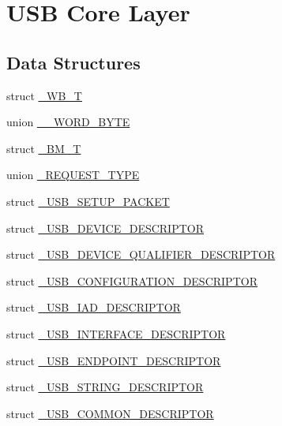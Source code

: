 \hypertarget{group__USBD__Core}{\section{U\-S\-B Core Layer}
\label{group__USBD__Core}
}
\subsection*{Data Structures}
\begin{DoxyCompactItemize}
\item 
struct \hyperlink{struct__WB__T}{\-\_\-\-W\-B\-\_\-\-T}
\item 
union \hyperlink{union____WORD__BYTE}{\-\_\-\-\_\-\-W\-O\-R\-D\-\_\-\-B\-Y\-T\-E}
\item 
struct \hyperlink{struct__BM__T}{\-\_\-\-B\-M\-\_\-\-T}
\item 
union \hyperlink{union__REQUEST__TYPE}{\-\_\-\-R\-E\-Q\-U\-E\-S\-T\-\_\-\-T\-Y\-P\-E}
\item 
struct \hyperlink{struct__USB__SETUP__PACKET}{\-\_\-\-U\-S\-B\-\_\-\-S\-E\-T\-U\-P\-\_\-\-P\-A\-C\-K\-E\-T}
\item 
struct \hyperlink{struct__USB__DEVICE__DESCRIPTOR}{\-\_\-\-U\-S\-B\-\_\-\-D\-E\-V\-I\-C\-E\-\_\-\-D\-E\-S\-C\-R\-I\-P\-T\-O\-R}
\item 
struct \hyperlink{struct__USB__DEVICE__QUALIFIER__DESCRIPTOR}{\-\_\-\-U\-S\-B\-\_\-\-D\-E\-V\-I\-C\-E\-\_\-\-Q\-U\-A\-L\-I\-F\-I\-E\-R\-\_\-\-D\-E\-S\-C\-R\-I\-P\-T\-O\-R}
\item 
struct \hyperlink{struct__USB__CONFIGURATION__DESCRIPTOR}{\-\_\-\-U\-S\-B\-\_\-\-C\-O\-N\-F\-I\-G\-U\-R\-A\-T\-I\-O\-N\-\_\-\-D\-E\-S\-C\-R\-I\-P\-T\-O\-R}
\item 
struct \hyperlink{struct__USB__IAD__DESCRIPTOR}{\-\_\-\-U\-S\-B\-\_\-\-I\-A\-D\-\_\-\-D\-E\-S\-C\-R\-I\-P\-T\-O\-R}
\item 
struct \hyperlink{struct__USB__INTERFACE__DESCRIPTOR}{\-\_\-\-U\-S\-B\-\_\-\-I\-N\-T\-E\-R\-F\-A\-C\-E\-\_\-\-D\-E\-S\-C\-R\-I\-P\-T\-O\-R}
\item 
struct \hyperlink{struct__USB__ENDPOINT__DESCRIPTOR}{\-\_\-\-U\-S\-B\-\_\-\-E\-N\-D\-P\-O\-I\-N\-T\-\_\-\-D\-E\-S\-C\-R\-I\-P\-T\-O\-R}
\item 
struct \hyperlink{struct__USB__STRING__DESCRIPTOR}{\-\_\-\-U\-S\-B\-\_\-\-S\-T\-R\-I\-N\-G\-\_\-\-D\-E\-S\-C\-R\-I\-P\-T\-O\-R}
\item 
struct \hyperlink{struct__USB__COMMON__DESCRIPTOR}{\-\_\-\-U\-S\-B\-\_\-\-C\-O\-M\-M\-O\-N\-\_\-\-D\-E\-S\-C\-R\-I\-P\-T\-O\-R}

\end{DoxyCompactItemize}
